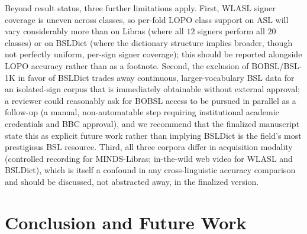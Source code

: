 \documentclass[journal]{IEEEtran}
\begin{document}
Beyond result status, three further limitations apply. First, WLASL signer coverage is uneven across classes, so per-fold LOPO class support on ASL will vary considerably more than on Libras (where all $12$ signers perform all $20$ classes) or on BSLDict (where the dictionary structure implies broader, though not perfectly uniform, per-sign signer coverage); this should be reported alongside LOPO accuracy rather than as a footnote. Second, the exclusion of BOBSL/BSL-1K in favor of BSLDict trades away continuous, larger-vocabulary BSL data for an isolated-sign corpus that is immediately obtainable without external approval; a reviewer could reasonably ask for BOBSL access to be pursued in parallel as a follow-up (a manual, non-automatable step requiring institutional academic credentials and BBC approval), and we recommend that the finalized manuscript state this as explicit future work rather than implying BSLDict is the field's most prestigious BSL resource. Third, all three corpora differ in acquisition modality (controlled recording for MINDS-Libras; in-the-wild web video for WLASL and BSLDict), which is itself a confound in any cross-linguistic accuracy comparison and should be discussed, not abstracted away, in the finalized version.

\section{Conclusion and Future Work}
\label{sec:conclusion}
\end{document}
